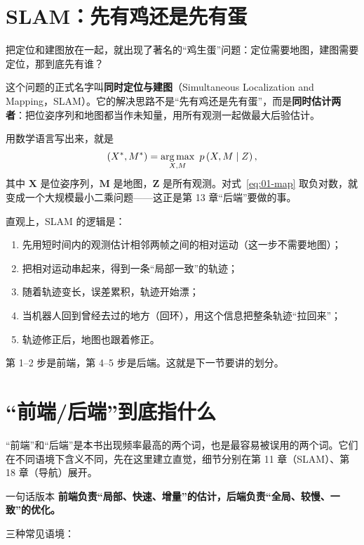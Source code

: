 \section{SLAM：先有鸡还是先有蛋}\label{sec:01-slam}

把定位和建图放在一起，就出现了著名的“鸡生蛋”问题：定位需要地图，建图需要定位，那到底先有谁？

这个问题的正式名字叫\textbf{同时定位与建图}（Simultaneous Localization and Mapping，SLAM）。它的解决思路不是“先有鸡还是先有蛋”，而是\textbf{同时估计两者}：把位姿序列和地图都当作未知量，用所有观测一起做最大后验估计。

用数学语言写出来，就是
\begin{equation}
\left(\bm{X}^{*},\bm{M}^{*}\right)=\argmax_{\bm{X},\bm{M}}\ p\left(\bm{X},\bm{M}\mid\bm{Z}\right),
\label{eq:01-map}
\end{equation}
其中 $\bm{X}$ 是位姿序列，$\bm{M}$ 是地图，$\bm{Z}$ 是所有观测。对式~\eqref{eq:01-map} 取负对数，就变成一个大规模最小二乘问题——这正是第 13 章“后端”要做的事。

直观上，SLAM 的逻辑是：
\begin{enumerate}
  \item 先用短时间内的观测估计相邻两帧之间的相对运动（这一步不需要地图）；
  \item 把相对运动串起来，得到一条“局部一致”的轨迹；
  \item 随着轨迹变长，误差累积，轨迹开始漂；
  \item 当机器人回到曾经去过的地方（回环），用这个信息把整条轨迹“拉回来”；
  \item 轨迹修正后，地图也跟着修正。
\end{enumerate}

第 1--2 步是前端，第 4--5 步是后端。这就是下一节要讲的划分。

\section{“前端/后端”到底指什么}\label{sec:01-febe}

“前端”和“后端”是本书出现频率最高的两个词，也是最容易被误用的两个词。它们在不同语境下含义不同，先在这里建立直觉，细节分别在第 11 章（SLAM）、第 18 章（导航）展开。

\begin{keybox}{一句话版本}
\textbf{前端负责“局部、快速、增量”的估计，后端负责“全局、较慢、一致”的优化。}
\end{keybox}


三种常见语境：

